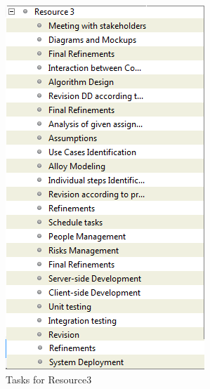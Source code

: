 	\begin{figure}[h]
		\includegraphics[scale=0.55]{img/Resource3.png}
		\caption{Tasks for Resource3}
	\end{figure}